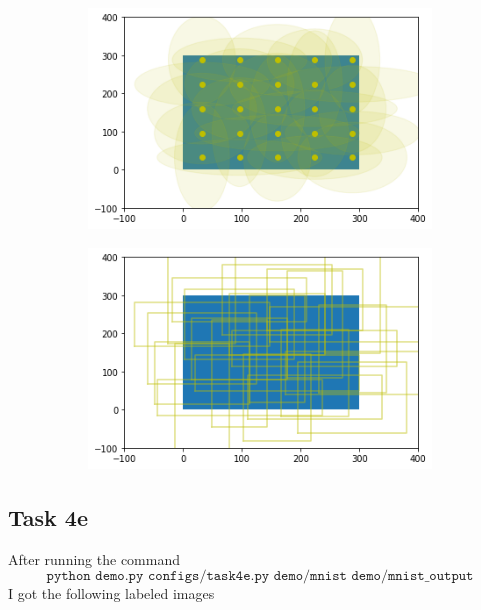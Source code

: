 \begin{figure}[h!]
    \centering
    \begin{subfigure}[b]{0.49\textwidth}
        \centering
        \includegraphics[width=\textwidth]{Images/task4d_plot_circles.png}
    \end{subfigure}
    \hfill
    \begin{subfigure}[b]{0.49\textwidth}
        \centering
        \includegraphics[width=\textwidth]{Images/task4d_plot_rectangles.png}
    \end{subfigure}
\end{figure}


\clearpage
\subsection*{Task 4e}

After running the command 
\begin{equation*}
    \texttt{python demo.py configs/task4e.py demo/mnist demo/mnist\_output}
\end{equation*}
I got the following labeled images

